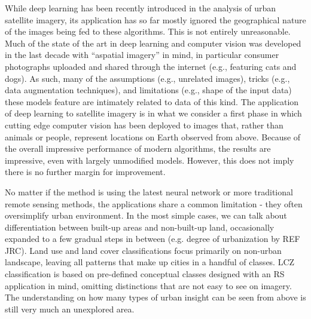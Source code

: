 

While deep learning has been recently introduced in the analysis of urban satellite
imagery, its application has so far mostly ignored the geographical nature of
the images being fed to these algorithms. This is not entirely unreasonable.
Much of the state of the art in deep learning and computer vision was
developed in the last decade with ``aspatial imagery'' in mind, in particular consumer
photographs uploaded and shared through the internet (e.g., featuring cats and
dogs). As such, many of the assumptions (e.g., unrelated images), tricks
(e.g., data augmentation techniques), and limitations (e.g., shape of the
input data) these models
feature are intimately related to data of this kind. The application of deep
learning to satellite imagery is in what we consider a first phase in which
cutting edge computer vision has been deployed to images that, rather than
animals or people, represent locations on Earth observed from above. Because
of the overall impressive performance of modern algorithms, the results are
impressive, even with largely unmodified models. However, this does not imply
there is no further margin for improvement.

No matter if the method is using the latest neural network or more traditional remote
sensing methods, the applications share a common limitation - they often oversimplify urban
environment. In the most simple cases, we can talk about differentiation between
built-up areas and non-built-up land, occasionally expanded to a few gradual steps in
between (e.g. degree of urbanization by REF JRC). Land use and land cover classifications focus primarily on non-urban
landscape, leaving all patterns that make up cities in a handful of classes. LCZ classification is
based on pre-defined conceptual classes designed with an RS application in mind, omitting
distinctions that are not easy to see on imagery. The understanding on how many
types of urban insight can be seen from above is still very much an unexplored area.

